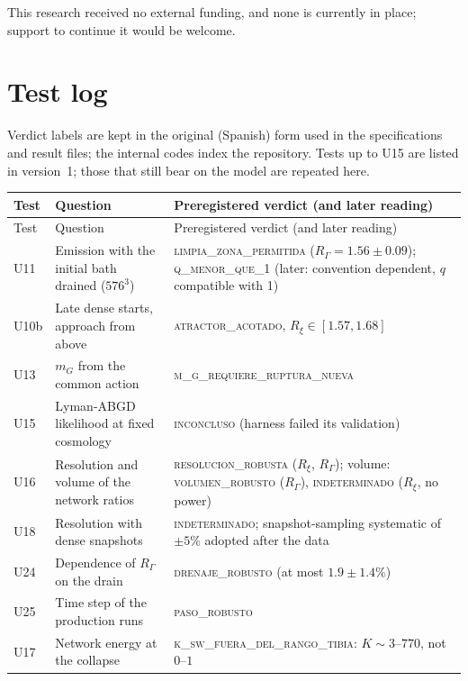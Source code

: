 \documentclass[11pt,a4paper]{article}
\newcommand{\RG}{R_\Gamma}
\newcommand{\Rxi}{R_\xi}
\begin{document}
This research received no external funding, and none is currently in place; support to continue it would be welcome.

\appendix
\section{Test log}
\label{app:log}

Verdict labels are kept in the original (Spanish) form used in the specifications and result files; the internal codes index the repository.
Tests up to U15 are listed in version~1; those that still bear on the model are repeated here.

\begin{small}
\begin{longtable}{L{1.3cm}L{6.0cm}L{7.0cm}}
\toprule
Test & Question & Preregistered verdict (and later reading)\\
\midrule
\endfirsthead
\toprule
Test & Question & Preregistered verdict (and later reading)\\
\midrule
\endhead
\bottomrule
\endfoot
U11 & Emission with the initial bath drained ($576^3$) & \textsc{limpia\_zona\_permitida} ($\RG=1.56\pm0.09$); \textsc{q\_menor\_que\_1} (later: convention dependent, $q$ compatible with 1) \\
U10b & Late dense starts, approach from above & \textsc{atractor\_acotado}, $\Rxi\in[1.57,1.68]$ \\
U13 & $m_G$ from the common action & \textsc{m\_g\_requiere\_ruptura\_nueva} \\
U15 & Lyman-ABGD likelihood at fixed cosmology & \textsc{inconcluso} (harness failed its validation) \\
U16 & Resolution and volume of the network ratios & \textsc{resolucion\_robusta} ($\Rxi$, $\RG$); volume: \textsc{volumen\_robusto} ($\RG$), \textsc{indeterminado} ($\Rxi$, no power) \\
U18 & Resolution with dense snapshots & \textsc{indeterminado}; snapshot-sampling systematic of $\pm5\%$ adopted after the data \\
U24 & Dependence of $\RG$ on the drain & \textsc{drenaje\_robusto} (at most $1.9\pm1.4\%$) \\
U25 & Time step of the production runs & \textsc{paso\_robusto} \\
U17 & Network energy at the collapse & \textsc{k\_sw\_fuera\_del\_rango\_tibia}: $K\sim3$--$770$, not $0$--$1$ \\

\end{longtable}
\end{small}
\end{document}
